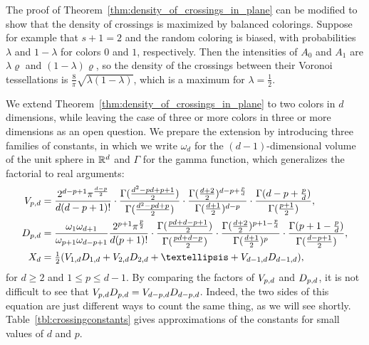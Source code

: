 \documentclass[a4paper]{article}
\newcommand {\mm}[1]   {\ifmmode{#1}\else{\mbox{\(#1\)}}\fi}
\newcommand{\Rspace}        {\mm{{\mathbb R}}}
\newcommand{\VV}[2]         {\mm{V_{#1,#2}}}
\newcommand{\DD}[2]         {\mm{D_{#1,#2}}}
\newcommand{\XX}[1]         {\mm{X_{#1}}}
\theoremstyle{definition}
\numberwithin{theorem}{section}
\numberwithin{equation}{section}
\begin{document}
The proof of Theorem~\ref{thm:density_of_crossings_in_plane} can be modified to show that the density of crossings is maximized by balanced colorings.
Suppose for example that $s+1 = 2$ and the random coloring is biased, with probabilities $\lambda$ and $1-\lambda$ for colors $0$ and $1$, respectively.
Then the intensities of $A_0$ and $A_1$ are $\lambda \varrho$ and $(1-\lambda) \varrho$, so the density of the crossings between their Voronoi tessellations is $\frac{8}{\pi} \sqrt{\lambda (1-\lambda)}$, which is a maximum for $\lambda = \frac{1}{2}$.

\medskip
We extend Theorem~\ref{thm:density_of_crossings_in_plane} to two colors in $d$ dimensions, while leaving the case of three or more colors in three or more dimensions as an open question.
We prepare the extension by introducing three families of constants, in which we write $\omega_d$ for the $(d-1)$-dimensional volume of the unit sphere in $\Rspace^d$ and $\Gamma$ for the gamma function, which generalizes the factorial to real arguments:
\begin{align}
  \VV{p}{d}  &=  \frac{2^{d-p+1} \pi^{\frac{d-p}{2}}}{d (d-p+1)!} \cdot
    \frac{\Gamma(\frac{d^2-pd+p+1}{2})}{\Gamma(\frac{d^2-pd+p}{2})} \cdot
    \frac{\Gamma(\frac{d+2}{2})^{d-p+\frac{p}{d}}}{\Gamma(\frac{d+1}{2})^{d-p}} \cdot
    \frac{\Gamma(d-p+\frac{p}{d})}{\Gamma(\frac{p+1}{2})} , 
    \label{eqn:VV} \\
  \DD{p}{d}  &=  \frac{\omega_1 \omega_{d+1}}{\omega_{p+1} \omega_{d-p+1}}
    \frac{2^{p+1} \pi^{\frac{p}{2}}}{d (p+1)!} \cdot
    \frac{\Gamma(\frac{pd+d-p+1}{2})}{\Gamma(\frac{pd+d-p}{2})} \cdot
    \frac{\Gamma(\frac{d+2}{2})^{p+1-\frac{p}{d}}}{\Gamma(\frac{d+1}{2})^{p}} \cdot
    \frac{\Gamma(p+1-\frac{p}{d})}{\Gamma(\frac{d-p+1}{2})} , 
    \label{eqn:DD} \\
  \XX{d}     &=  \tfrac{1}{2} ( \VV{1}{d} \DD{1}{d} + \VV{2}{d} \DD{2}{d} + \ldots + \VV{d-1}{d} \DD{d-1}{d} ),
    \label{eqn:XX}
\end{align}
for $d \geq 2$ and $1 \leq p \leq d-1$.
By comparing the factors of $\VV{p}{d}$ and $\DD{p}{d}$, it is not difficult to see that $\VV{p}{d} \DD{p}{d} = \VV{d-p}{d} \DD{d-p}{d}$.
Indeed, the two sides of this equation are just different ways to count the same thing, as we will see shortly.
Table~\ref{tbl:crossingconstants} gives approximations of the constants for small values of $d$ and $p$.
\end{document}
